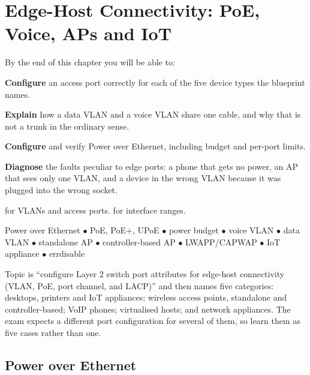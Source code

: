 \chapter{Edge-Host Connectivity: PoE, Voice, APs and IoT}\label{ch:edgehost}

\begin{outcomes}
By the end of this chapter you will be able to:
\begin{tight}
  \item \textbf{Configure} an access port correctly for each of the five device
        types the blueprint names.
  \item \textbf{Explain} how a data VLAN and a voice VLAN share one cable, and
        why that is not a trunk in the ordinary sense.
  \item \textbf{Configure} and verify Power over Ethernet, including budget and
        per-port limits.
  \item \textbf{Diagnose} the faults peculiar to edge ports: a phone that gets no
        power, an AP that sees only one VLAN, and a device in the wrong VLAN
        because it was plugged into the wrong socket.
\end{tight}
\end{outcomes}

\begin{prereq}
 for VLANs and access ports.  for interface ranges.
\end{prereq}

\begin{keyterms}
Power over Ethernet $\bullet$ PoE, PoE+, UPoE $\bullet$ power budget $\bullet$
voice VLAN $\bullet$ data VLAN $\bullet$ standalone AP $\bullet$ controller-based
AP $\bullet$ LWAPP/CAPWAP $\bullet$ IoT appliance $\bullet$ errdisable
\end{keyterms}

\begin{examnote}
Topic  is ``configure Layer 2 switch port attributes for edge-host
connectivity (VLAN, PoE, port channel, and LACP)'' and then names five
categories: desktops, printers and IoT appliances; wireless access points,
standalone and controller-based; VoIP phones; virtualised hosts; and network
appliances. The exam expects a different port configuration for several of them,
so learn them as five cases rather than one.
\end{examnote}

\section{Power over Ethernet}

